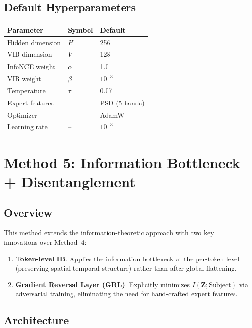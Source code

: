 \documentclass{article}
\begin{document}
\subsection{Default Hyperparameters}

\begin{table}[h]
\centering
\small
\begin{tabular}{@{}lll@{}}
\toprule
Parameter & Symbol & Default \\
\midrule
Hidden dimension & $H$ & 256 \\
VIB dimension & $V$ & 128 \\
InfoNCE weight & $\alpha$ & 1.0 \\
VIB weight & $\beta$ & $10^{-3}$ \\
Temperature & $\tau$ & 0.07 \\
Expert features & -- & PSD (5 bands) \\
Optimizer & -- & AdamW \\
Learning rate & -- & $10^{-3}$ \\
\bottomrule
\end{tabular}
\end{table}

\section{Method 5: Information Bottleneck + Disentanglement}
\label{sec:ib}

\subsection{Overview}

This method extends the information-theoretic approach with two key innovations over Method~4:
\begin{enumerate}
\item \textbf{Token-level IB}: Applies the information bottleneck at the per-token level (preserving spatial-temporal structure) rather than after global flattening.
\item \textbf{Gradient Reversal Layer (GRL)}: Explicitly minimizes $I(\bm{Z}; \text{Subject})$ via adversarial training, eliminating the need for hand-crafted expert features.
\end{enumerate}

\subsection{Architecture}
\end{document}

